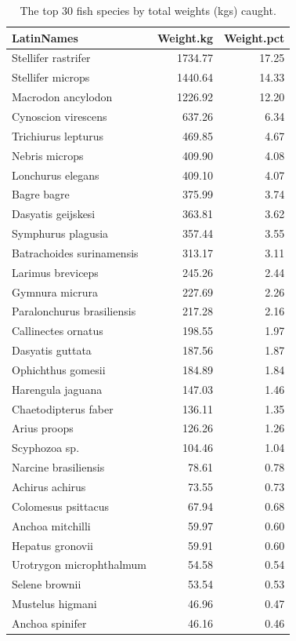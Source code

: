 \documentclass[
]{book}
\begin{document}
\begin{table}

\caption{\label{tab:unnamed-chunk-10}The top 30 fish species by total weights (kgs) caught.}
\centering
\begin{tabular}[t]{l|r|r}
\hline
\textbf{LatinNames} & \textbf{Weight.kg} & \textbf{Weight.pct}\\
\hline
Stellifer rastrifer & 1734.77 & 17.25\\
\hline
Stellifer microps & 1440.64 & 14.33\\
\hline
Macrodon ancylodon & 1226.92 & 12.20\\
\hline
Cynoscion virescens & 637.26 & 6.34\\
\hline
Trichiurus lepturus & 469.85 & 4.67\\
\hline
Nebris microps & 409.90 & 4.08\\
\hline
Lonchurus elegans & 409.10 & 4.07\\
\hline
Bagre bagre & 375.99 & 3.74\\
\hline
Dasyatis geijskesi & 363.81 & 3.62\\
\hline
Symphurus plagusia & 357.44 & 3.55\\
\hline
Batrachoides surinamensis & 313.17 & 3.11\\
\hline
Larimus breviceps & 245.26 & 2.44\\
\hline
Gymnura micrura & 227.69 & 2.26\\
\hline
Paralonchurus brasiliensis & 217.28 & 2.16\\
\hline
Callinectes ornatus & 198.55 & 1.97\\
\hline
Dasyatis guttata & 187.56 & 1.87\\
\hline
Ophichthus gomesii & 184.89 & 1.84\\
\hline
Harengula jaguana & 147.03 & 1.46\\
\hline
Chaetodipterus faber & 136.11 & 1.35\\
\hline
Arius proops & 126.26 & 1.26\\
\hline
Scyphozoa sp. & 104.46 & 1.04\\
\hline
Narcine brasiliensis & 78.61 & 0.78\\
\hline
Achirus achirus & 73.55 & 0.73\\
\hline
Colomesus psittacus & 67.94 & 0.68\\
\hline
Anchoa mitchilli & 59.97 & 0.60\\
\hline
Hepatus gronovii & 59.91 & 0.60\\
\hline
Urotrygon microphthalmum & 54.58 & 0.54\\
\hline
Selene brownii & 53.54 & 0.53\\
\hline
Mustelus higmani & 46.96 & 0.47\\
\hline
Anchoa spinifer & 46.16 & 0.46\\
\hline
\end{tabular}
\end{table}
\end{document}
